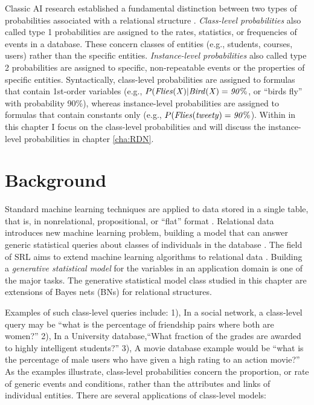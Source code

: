 \documentclass{sfuthesis}
\begin{document}
Classic AI research established a fundamental distinction between two types of probabilities associated with a relational structure \cite{Halpern90,Bacchus90}. {\em Class-level probabilities} also called type 1 probabilities are assigned to the rates, statistics, or frequencies of events in a database. These concern classes of entities (e.g., students, courses, users) rather than the specific entities. {\em Instance-level probabilities} also called type 2 probabilities are assigned to specific, non-repeatable events or the properties of specific entities. Syntactically, class-level probabilities are assigned to formulas that contain 1st-order variables 
 (e.g., $P(\it{Flies}(X)|\it{Bird}(X) = 90\%$, or ``birds fly'' with probability 90\%), whereas instance-level probabilities are assigned to formulas that contain constants only %
(e.g., $P(\it{Flies}(\it{tweety}) = 90\%$). Within in this chapter I  focus on the class-level probabilities and will discuss the  instance-level probabilities in chapter \ref{cha:RDN}.

 
\section{Background} 
Standard machine learning techniques are applied to data stored in a single table, that is, in nonrelational, propositional, or ``flat'' format \cite{Mitchell1997}. Relational data introduces new machine learning problem, building a model that can answer generic statistical queries about classes of individuals in the database \cite{Getoor2001}. The field of SRL aims to extend machine learning algorithms to relational data \cite{getoor-intro,deRaedt08}. Building a {\em generative statistical model} for the variables in an application domain \cite{getoor-intro} is one of the major tasks. The generative statistical model class studied in this chapter are extensions of Bayes nets (BNs) for relational structures. 

Examples of such class-level queries include:
1), In a social network, a class-level query may be ``what is the percentage of friendship pairs where both are women?'' 
2), In a University database,``What fraction of the grades are awarded to highly intelligent students?'' 
3), A movie database example would be ``what is the percentage of male users who have given a high rating to an action movie?'' 
As the examples illustrate, class-level probabilities concern the proportion, or rate of generic events and conditions, rather than the attributes and links of individual entities. There are several applications of class-level models:
\end{document}
